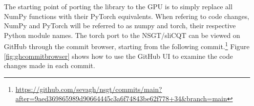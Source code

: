 \documentclass[report.tex]{subfiles}
\begin{document}
The starting point of porting the library to the GPU is to simply replace all NumPy functions with their PyTorch equivalents. When refering to code changes, NumPy and PyTorch will be referred to as numpy and torch, their respective Python module names. The torch port to the NSGT/sliCQT can be viewed on GitHub through the commit browser, starting from the following commit.\footnote{\url{https://github.com/sevagh/nsgt/commits/main?after=9aed369865989d90664445c3a6f74843be62f778+34&branch=main}} Figure \ref{fig:ghcommitbrowser} shows how to use the GitHub UI to examine the code changes made in each commit.

\end{document}
